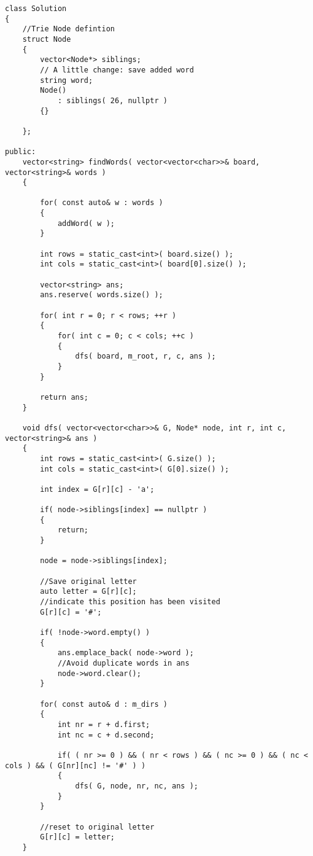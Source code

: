 \setcounter{lstlisting}{0}
\begin{lstlisting}[style=customc, caption={DFS And Trie}]
class Solution
{
	//Trie Node defintion
    struct Node
    {
        vector<Node*> siblings;
		// A little change: save added word
        string word;
        Node()
            : siblings( 26, nullptr )
        {}

    };

public:
    vector<string> findWords( vector<vector<char>>& board, vector<string>& words )
    {

        for( const auto& w : words )
        {
            addWord( w );
        }

        int rows = static_cast<int>( board.size() );
        int cols = static_cast<int>( board[0].size() );

        vector<string> ans;
        ans.reserve( words.size() );

        for( int r = 0; r < rows; ++r )
        {
            for( int c = 0; c < cols; ++c )
            {
                dfs( board, m_root, r, c, ans );
            }
        }

        return ans;
    }

    void dfs( vector<vector<char>>& G, Node* node, int r, int c, vector<string>& ans )
    {
        int rows = static_cast<int>( G.size() );
        int cols = static_cast<int>( G[0].size() );

        int index = G[r][c] - 'a';

        if( node->siblings[index] == nullptr )
        {
            return;
        }

        node = node->siblings[index];

		//Save original letter 
        auto letter = G[r][c];
		//indicate this position has been visited
        G[r][c] = '#'; 

        if( !node->word.empty() )
        {
            ans.emplace_back( node->word );
			//Avoid duplicate words in ans
            node->word.clear();
        }

        for( const auto& d : m_dirs )
        {
            int nr = r + d.first;
            int nc = c + d.second;

            if( ( nr >= 0 ) && ( nr < rows ) && ( nc >= 0 ) && ( nc < cols ) && ( G[nr][nc] != '#' ) )
            {
                dfs( G, node, nr, nc, ans );
            }
        }

		//reset to original letter
        G[r][c] = letter; 
    }


\end{lstlisting}
